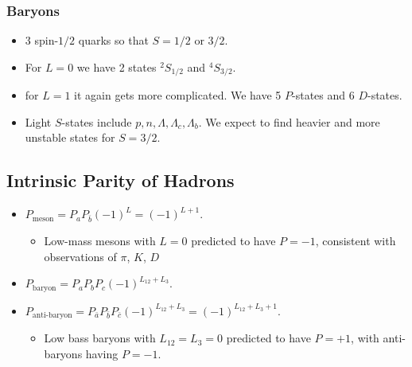 \subsubsection{Baryons}
\begin{itemize}
    \item 3 spin-$1 / 2$ quarks so that $S = 1 / 2$ or $3 / 2$. 
    \item For $L = 0$ we have 2 states $^{2}S_{1 / 2}$ and $^{4}S_{3 / 2}$. 
    \item for $L = 1$ it again gets more complicated. We have 5 $P$-states and 6 $D$-states. 
    \item Light $S$-states include $p, n, Λ, Λ_{c}, Λ_{b}$. We expect to find heavier and more unstable states for $S = 3 / 2$. 
\end{itemize}

\subsection{Intrinsic Parity of Hadrons}
\begin{itemize}
    \item $P_{\text{meson}} = P_a P_{\bar{b}} (-1)^{L} = (-1)^{L+1}$. 
    \begin{itemize}
        \item Low-mass mesons with $L=0$ predicted to have $P = -1$, consistent with observations of $π$, $K$, $D$
    \end{itemize}
    \item $P_{\text{baryon}} = P_a P_b P_c (-1)^{L_{12} + L_3}$. 
    \item $P_{\text{anti-baryon}} = P_{\bar{a}} P_{\bar{b}} P_{\bar{c}} (-1)^{L_{12} + L_3} = (-1)^{L_{12} + L_3 + 1}$.
    \begin{itemize}
        \item Low bass baryons with $L_{12} = L_3 = 0$ predicted to have $P = +1$, with anti-baryons having $P = -1$.
    \end{itemize}
\end{itemize}

